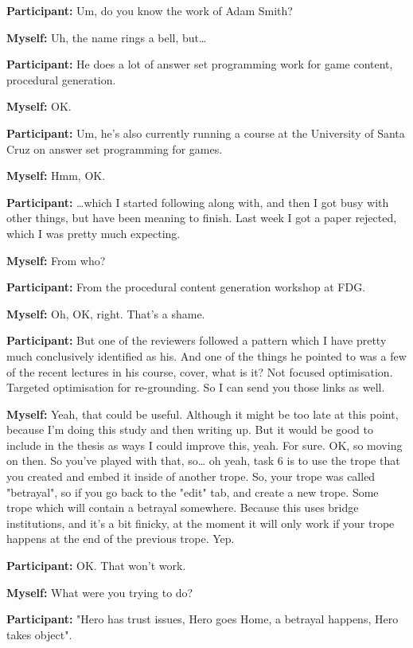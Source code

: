 \documentclass[11pt]{report}
\newcommand{\llabel}[1]{\hypertarget{llineno:#1}{\linelabel{#1}}}
\begin{document}
\begin{linenumbers}
\textbf{Participant:} Um, do you know the work of Adam Smith?

\textbf{Myself:} Uh, the name rings a bell, but\ldots{}

\textbf{Participant:} He does a lot of answer set programming work for game content, procedural generation.

\textbf{Myself:} OK.

\textbf{Participant:} Um, he's also currently running a course at the University of Santa Cruz on answer set programming for games.

\textbf{Myself:} Hmm, OK.

\textbf{Participant:} \ldots{}which I started following along with, and then I got busy with other things, but have been meaning to finish. Last week I got a paper rejected, which I was pretty much expecting.

\textbf{Myself:} From who?

\textbf{Participant:} From the procedural content generation workshop at FDG.

\textbf{Myself:} Oh, OK, right. That's a shame.

\textbf{Participant:} But one of the reviewers followed a pattern which I have pretty much conclusively identified as his. And one of the things he pointed to was a few of the recent lectures in his course, cover, what is it? Not focused optimisation. Targeted optimisation for re-grounding. So I can send you those links as well.

\textbf{Myself:} Yeah, that could be useful. Although it might be too late at this point, because I'm doing this study and then writing up. But it would be good to include in the thesis as ways I could improve this, yeah. For sure. OK, so moving on then. So you've played with that, so\ldots{} oh yeah, task 6 is to use the trope that you created and embed it inside of another trope. So, your trope was called "betrayal", so if you go back to the "edit" tab, and create a new trope. Some trope which will contain a betrayal somewhere. Because this uses bridge institutions, and it's a bit finicky, at the moment it will only work if your trope happens at the end of the previous trope. Yep.

\textbf{Participant:} OK. That won't work.

\textbf{Myself:} What were you trying to do?

\textbf{Participant:} "Hero has trust issues, Hero goes Home, a betrayal
happens, Hero takes object".\llabel{lne:bug3h}


\end{linenumbers}
\end{document}
